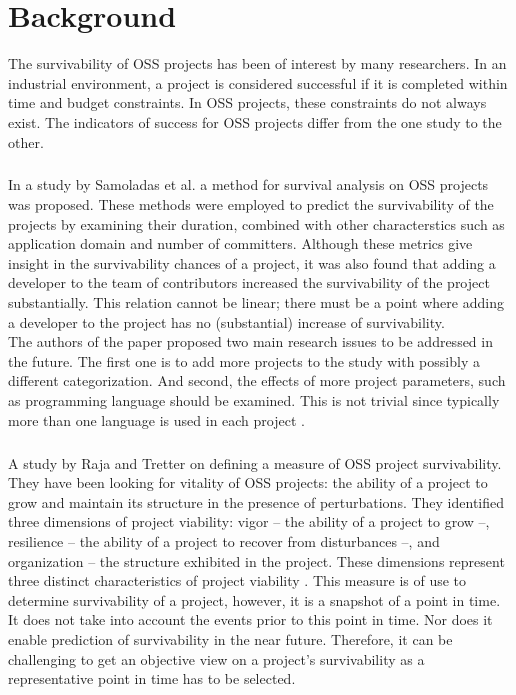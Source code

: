 \chapter{Background}
\label{background}

The survivability of OSS projects has been of interest by many researchers. In
an industrial environment, a project is considered successful if it is completed
within time and budget constraints. In OSS projects, these constraints do not
always exist. The indicators of success for OSS projects differ from the one
study to the other.

\paragraph{}
In a study by Samoladas et al. a method for survival analysis on OSS projects
was proposed. These methods were employed to predict the survivability of the
projects by examining their duration, combined with other characterstics such
as application domain and number of committers. Although these metrics give
insight in the survivability chances of a project, it was also found that
adding a developer to the team of contributors increased the survivability of
the project substantially. This relation cannot be linear; there must be a
point where adding a developer to the project has no (substantial) increase of
survivability.\\
The authors of the paper proposed two main research issues to be addressed in
the future. The first one is to add more projects to the study with possibly a
different categorization.
And second, the effects of more project parameters, such as programming
language should be examined. This is not trivial since typically more than one
language is used in each project \cite{samoladas2010}.

\paragraph{}
A study by Raja and Tretter on defining a measure of OSS project survivability.
They have been looking for vitality of OSS projects: the ability of a project
to grow and maintain its structure in the presence of perturbations. They
identified three dimensions of project viability: vigor -- the ability of a
project to grow --, resilience -- the ability of a project to recover from
disturbances --, and organization -- the structure exhibited in the project.
These dimensions represent three distinct characteristics of project viability
\cite{raja2012}. This measure is of use to determine survivability of a
project, however, it is a snapshot of a point in time. It does not take into
account the events prior to this point in time. Nor does it enable prediction of
survivability in the near future. Therefore, it can be challenging to get an
objective view on a project's survivability as a representative point in
time has to be selected.

